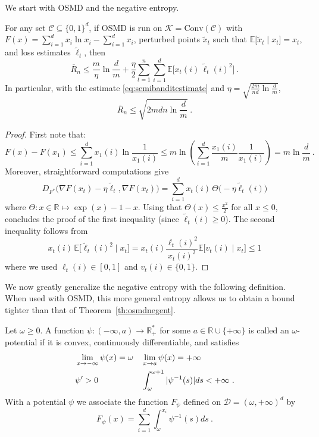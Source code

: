 \documentclass[11pt]{hackednow}
\newcommand{\E}{\mathbb{E}}
\newcommand{\R}{\mathbb{R}}
\newcommand{\cC}{\mathcal{C}}
\newcommand{\cK}{\mathcal{K}}
\newcommand{\cD}{\mathcal{D}}
\newcommand{\oR}{\overline{R}}
\renewcommand{\tilde}{\widetilde}
\newcommand{\conv}{\mathrm{Conv}}
\begin{document}
We start with OSMD and the negative entropy.
\begin{theorem}
\label{th:osmdnegent}
For any set $\cC\subseteq\{0,1\}^d$, if OSMD is run on $\cK=\conv(\cC)$ with $F(x) = \sum_{i=1}^d x_i \ln x_i - \sum_{i=1}^d x_i$, perturbed points $\tilde{x}_t$ such that $\E\bigl[\tilde{x}_t \mid x_t\bigr] = x_t$, and loss estimates $\tilde{\ell}_t$, then
$$\oR_n \leq \frac{m}{\eta}\ln \frac{d}{m} + \frac{\eta}{2} \sum_{t=1}^n \sum_{i=1}^d \E\bigl[x_t(i)\,\tilde{\ell}_t(i)^2\bigr]~.$$
In particular, with the estimate \eqref{eq:semibanditestimate} and $\eta= \sqrt{\frac{2m}{nd}\ln\frac{d}{m}}$,
$$\oR_n \leq  \sqrt{2 m d n \ln \frac{d}{m}}~.$$
\end{theorem}
\begin{proof}
First note that:
$$F(x) - F(x_1) \leq \sum_{i=1}^d x_1(i) \ln \frac{1}{x_1(i)} \leq m \ln \left( \sum_{i=1}^d \frac{x_1(i)}{m} \frac{1}{x_1(i)}\right) = m \ln \frac{d}{m}~.$$
Moreover, straightforward computations give
$$D_{F^*}\bigg(\nabla F(x_t) - \eta \tilde{\ell}_t, \nabla F(x_t)\bigg) =\sum_{i=1}^d x_{t}(i)\, \Theta\bigl(- \eta \tilde{\ell}_t(i)\bigr)$$
where $\Theta : x \in \R \mapsto \exp(x) - 1 - x$. Using that $\Theta(x) \leq \frac{x^2}{2}$ for all $x \leq 0$, concludes the proof of the first inequality (since $\tilde{\ell}_t(i) \geq 0$). The second inequality follows from
\[
    x_t(i)\,\E\bigl[\tilde{\ell}_t(i)^2 \mid x_t\bigr] = x_t(i)\frac{\ell_t(i)^2}{x_t(i)^2}\E\bigl[v_t(i) \mid x_t\bigr] \le 1
\]
where we used $\ell_t(i) \in [0,1]$ and $v_t(i) \in \{0,1\}$.
\end{proof}
We now greatly generalize the negative entropy with the following definition. When used with OSMD, this more general entropy allows us to obtain a bound tighter than that of Theorem~\ref{th:osmdnegent}.
\begin{definition}
Let $\omega \ge 0$.
A function 
$\psi: (-\infty,a) \rightarrow \R^*_+$ for some 
$a\in\R\cup\{+\infty\}$ is called an 
$\omega$-potential if it is convex,
 continuously differentiable, and satisfies
\begin{align*} 
& \lim_{x\rightarrow -\infty} \psi(x)=\omega &&
\lim_{x\rightarrow a} \psi(x)= +\infty \notag \\
& \psi' > 0 && \int_{\omega}^{\omega+1} |\psi^{-1}(s)|ds <+\infty~.
\end{align*}
With a potential $\psi$ we associate the function $F_{\psi}$ defined on $\cD=(\omega, +\infty)^d$ by
$$F_{\psi}(x) = \sum_{i=1}^d \int_{\omega}^{x_i} \psi^{-1}(s) ds~.$$
\end{definition}
\end{document}

